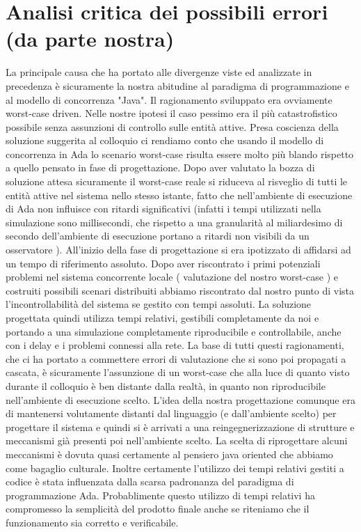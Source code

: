 \section{Analisi critica dei possibili errori (da parte nostra)}
La principale causa che ha portato alle divergenze viste ed analizzate in precedenza è sicuramente la nostra abitudine al paradigma di programmazione e al modello di concorrenza "Java". Il ragionamento sviluppato era ovviamente worst-case driven.  Nelle nostre ipotesi il caso pessimo era il più catastrofistico possibile senza assunzioni di controllo sulle entità attive. Presa coscienza della soluzione suggerita al colloquio ci rendiamo conto che usando il modello di concorrenza in Ada lo scenario worst-case risulta essere molto più blando rispetto a quello pensato in fase di progettazione. Dopo aver valutato la bozza di soluzione attesa sicuramente il worst-case reale si riduceva al risveglio di tutti le entità attive nel sistema nello stesso istante, fatto che nell'ambiente di esecuzione di Ada non influisce con ritardi significativi (infatti i tempi utilizzati nella simulazione sono millisecondi, che rispetto a una granularità al miliardesimo di secondo dell’ambiente di esecuzione portano a ritardi non visibili da un osservatore ). All'inizio della fase di progettazione si era ipotizzato di affidarsi ad un tempo di riferimento assoluto. Dopo aver riscontrato i primi potenziali problemi nel sistema concorrente locale ( valutazione del nostro worst-case ) e costruiti possibili scenari distribuiti abbiamo riscontrato dal nostro punto di vista l'incontrollabilità del sistema se gestito con tempi assoluti. La soluzione progettata quindi utilizza tempi relativi, gestibili completamente da noi e portando a una simulazione completamente riproducibile e controllabile, anche con i delay e i problemi connessi alla rete. La base di tutti questi ragionamenti, che ci ha portato a commettere errori di valutazione che si sono poi propagati a cascata, è sicuramente l'assunzione di un worst-case che alla luce di quanto visto durante il colloquio è ben distante dalla realtà, in quanto non riproducibile nell'ambiente di esecuzione scelto. L'idea della nostra progettazione comunque era di mantenersi volutamente distanti dal linguaggio (e dall'ambiente scelto) per progettare il sistema e quindi si è arrivati a una reingegnerizzazione di strutture e meccanismi già presenti poi nell'ambiente scelto. La scelta di riprogettare alcuni meccanismi è dovuta quasi certamente al pensiero java oriented che abbiamo come bagaglio culturale. Inoltre certamente l’utilizzo dei tempi relativi gestiti a codice è stata influenzata dalla scarsa padronanza del paradigma di programmazione Ada. Probablimente questo utilizzo di tempi relativi ha compromesso la semplicità del prodotto finale anche se riteniamo che il funzionamento sia corretto e verificabile.\\
